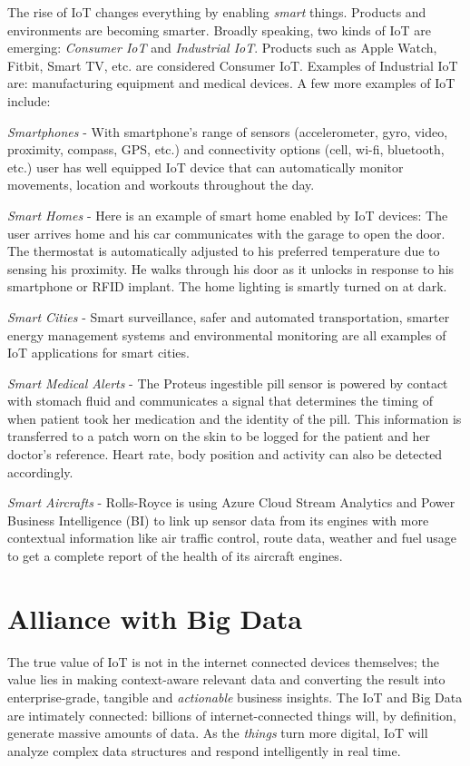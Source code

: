\documentclass[sigconf]{acmart}
\begin{document}
The rise of IoT changes everything by enabling {\em smart} things. Products and environments are becoming smarter. Broadly speaking, two kinds of IoT are emerging: {\em Consumer IoT} and {\em Industrial IoT}. Products such as Apple Watch, Fitbit, Smart TV, etc. are considered Consumer IoT. Examples of Industrial IoT are: manufacturing equipment and medical devices. A few more examples of IoT include:

{\em Smartphones} - With smartphone's range of sensors (accelerometer, gyro, video, proximity, compass, GPS, etc.) and connectivity options (cell, wi-fi, bluetooth, etc.) user has well equipped IoT device that can automatically monitor movements, location and workouts throughout the day.

{\em Smart Homes} - Here is an example of smart home enabled by IoT devices: The user arrives home and his car communicates with the garage to open the door. The thermostat is automatically adjusted to his preferred temperature due to sensing his proximity. He walks through his door as it unlocks in response to his smartphone or RFID implant. The home lighting is smartly turned on at dark.

{\em Smart Cities} - Smart surveillance, safer and automated transportation, smarter energy management systems and environmental monitoring are all examples of IoT applications for smart cities.

{\em Smart Medical Alerts} - The Proteus ingestible pill sensor is powered by contact with stomach fluid and communicates a signal that determines the timing of when patient took her medication and the identity of the pill. This information is transferred to a patch worn on the skin to be logged for the patient and her doctor's reference. Heart rate, body position and activity can also be detected accordingly.

{\em Smart Aircrafts} - Rolls-Royce is using Azure Cloud Stream Analytics and Power Business Intelligence (BI) to link up sensor data from its engines with more contextual information like air traffic control, route data, weather and fuel usage to get a complete report of the health of its aircraft engines.

\section{Alliance with Big Data}

The true value of IoT is not in the internet connected devices themselves; the value lies in making context-aware relevant data and converting the result into enterprise-grade, tangible and {\em actionable} business insights. The IoT and Big Data are intimately connected: billions of internet-connected things will, by definition, generate massive amounts of data. As the {\em things} turn more digital, IoT will analyze complex data structures and respond intelligently in real time. 
\end{document}

